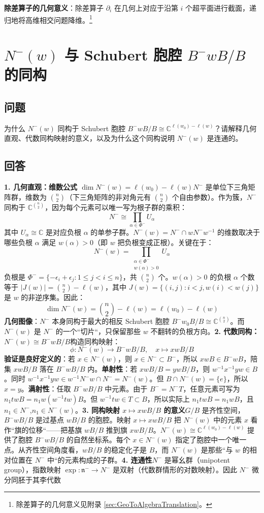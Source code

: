 \textbf{除差算子的几何意义}：除差算子 $\partial_i$ 在几何上对应于沿第 $i$ 个超平面进行截面，递归地将高维相交问题降维。\footnote{除差算子的几何意义见附录 \cref{sec:GeoToAlgebraTranslation}。}
\section{$N^{-}(w)$ 与 Schubert 胞腔 $B^{-}wB/B$ 的同构}\label{sec:NMinusW-Schubert-Cell}\subsection*{问题}为什么 $N^{-}(w)$ 同构于 Schubert 胞腔 $B^{-}wB/B \cong \mathbb{C}^{\ell(w_0)-\ell(w)}$？请解释几何直观、代数同构映射的意义，以及为什么这个同构说明 $N^{-}(w)$ 是连通的。\subsection*{回答}\textbf{1. 几何直观：维数公式 $\dim N^{-}(w) = \ell(w_0) - \ell(w)$}$N^{-}$ 是单位下三角矩阵群，维数为 $\binom{n}{2}$（下三角矩阵的非对角元有 $\binom{n}{2}$ 个自由参数）。作为簇，$N^{-}$ 同构于 $\mathbb{C}^{\binom{n}{2}}$，因为每个元素可以唯一写为根子群的乘积：$$N^{-} \cong \prod_{\alpha \in \Phi^{-}} U_{\alpha}$$其中 $U_{\alpha} \cong \mathbb{C}$ 是对应负根 $\alpha$ 的单参子群。$N^{-}(w) = N^{-} \cap wN^{-}w^{-1}$ 的维数取决于哪些负根 $\alpha$ 满足 $w(\alpha) > 0$（即 $w$ 把负根变成正根）。关键在于：$$N^{-}(w) = \prod_{\substack{\alpha \in \Phi^{-} \\ w(\alpha) > 0}} U_{\alpha}$$负根是 $\Phi^{-} = \{-\epsilon_i + \epsilon_j : 1 \leq j < i \leq n\}$，共 $\binom{n}{2}$ 个。$w(\alpha) > 0$ 的负根 $\alpha$ 个数等于 $|J(w)| = \binom{n}{2} - \ell(w)$，其中 $J(w) = \{(i,j) : i < j, w(i) < w(j)\}$ 是 $w$ 的非逆序集。因此：$$\dim N^{-}(w) = \binom{n}{2} - \ell(w) = \ell(w_0) - \ell(w)$$\textbf{几何图像}：$N^{-}$ 本身同构于最大的相反 Schubert 胞腔 $B^{-}w_0B/B \cong \mathbb{C}^{\binom{n}{2}}$。而 $N^{-}(w)$ 是 $N^{-}$ 的一个``切片``，只保留那些 $w$ 不翻转的负根方向。\textbf{2. 代数同构：$N^{-}(w) \cong B^{-}wB/B$}构造同构映射：$$\phi: N^{-}(w) \to B^{-}wB/B, \quad x \mapsto xwB/B$$\textbf{验证是良好定义的}：若 $x \in N^{-}(w)$，则 $x \in N^{-} \subset B^{-}$，所以 $xwB \in B^{-}wB$，陪集 $xwB/B$ 落在 $B^{-}wB/B$ 内。\textbf{单射性}：若 $xwB/B = ywB/B$，则 $w^{-1}x^{-1}yw \in B$。同时 $w^{-1}x^{-1}yw \in w^{-1}N^{-}w \cap N^{-} = N^{-}(w)$。但 $B \cap N^{-}(w) = \{e\}$，所以 $x = y$。\textbf{满射性}：任取 $B^{-}wB/B$ 中元素。由于 $B^{-} = N^{-}T$，任意元素可写为 $n_1 twB = n_1 w(w^{-1}tw)B$。但 $w^{-1}tw \in T \subset B$，所以实际上 $n_1 twB = n_1 wB$，且 $n_1 \in N^{-}$,$n_1 \in N^{-}(w)$。\textbf{3. 同构映射 $x \mapsto xwB/B$ 的意义}$G/B$ 是齐性空间，$B^{-}wB/B$ 是过基点 $wB/B$ 的胞腔。映射 $x \mapsto xwB/B$ 把 $N^{-}(w)$ 中的元素 $x$ 看作``旗的位移``——把基旗 $wB/B$ 推到旗 $xwB/B$。$N^{-}(w) \cong \mathbb{C}^{\ell(w_0)-\ell(w)}$ 提供了胞腔 $B^{-}wB/B$ 的自然坐标系。每个 $x \in N^{-}(w)$ 指定了胞腔中一个唯一点。从齐性空间角度看，$wB/B$ 的稳定化子是 $B$，而 $N^{-}(w)$ 是那些``与 $w$ 的相对位置在 $N^{-}$ 中``的元素构成的子群。\textbf{4. 连通性}$N^{-}$ 是幂幺群（unipotent group），指数映射 $\exp: \mathfrak{n}^{-} \to N^{-}$ 是双射（代数群情形的对数映射）。因此 $N^{-}$ 微分同胚于其李代数 